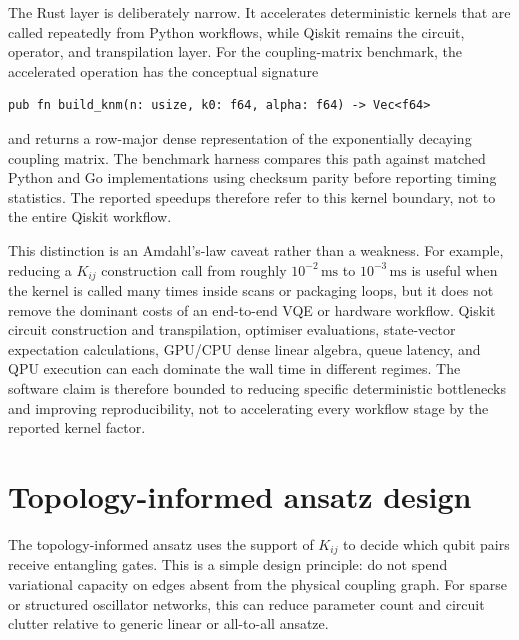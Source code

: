 \documentclass[preprint,aps,physrev,superscriptaddress,floatfix,longbibliography]{revtex4-2}
\begin{document}
The Rust layer is deliberately narrow. It accelerates deterministic kernels
that are called repeatedly from Python workflows, while Qiskit remains the
circuit, operator, and transpilation layer. For the coupling-matrix
benchmark, the accelerated operation has the conceptual signature

\begin{verbatim}
pub fn build_knm(n: usize, k0: f64, alpha: f64) -> Vec<f64>
\end{verbatim}

and returns a row-major dense representation of the exponentially decaying
coupling matrix. The benchmark harness compares this path against matched
Python and Go implementations using checksum parity before reporting timing
statistics. The reported speedups therefore refer to this kernel boundary,
not to the entire Qiskit workflow.

This distinction is an Amdahl's-law caveat rather than a weakness. For
example, reducing a $K_{ij}$ construction call from roughly
$10^{-2}\,\mathrm{ms}$ to $10^{-3}\,\mathrm{ms}$ is useful when the kernel is
called many times inside scans or packaging loops, but it does not remove the
dominant costs of an end-to-end VQE or hardware workflow. Qiskit circuit
construction and transpilation, optimiser evaluations, state-vector
expectation calculations, GPU/CPU dense linear algebra, queue latency, and QPU
execution can each dominate the wall time in different regimes. The software
claim is therefore bounded to reducing specific deterministic bottlenecks and
improving reproducibility, not to accelerating every workflow stage by the
reported kernel factor.

\section{Topology-informed ansatz design}

The topology-informed ansatz uses the support of $K_{ij}$ to decide which
qubit pairs receive entangling gates. This is a simple design principle:
do not spend variational capacity on edges absent from the physical
coupling graph. For sparse or structured oscillator networks, this can
reduce parameter count and circuit clutter relative to generic linear or
all-to-all ansatze.
\end{document}
